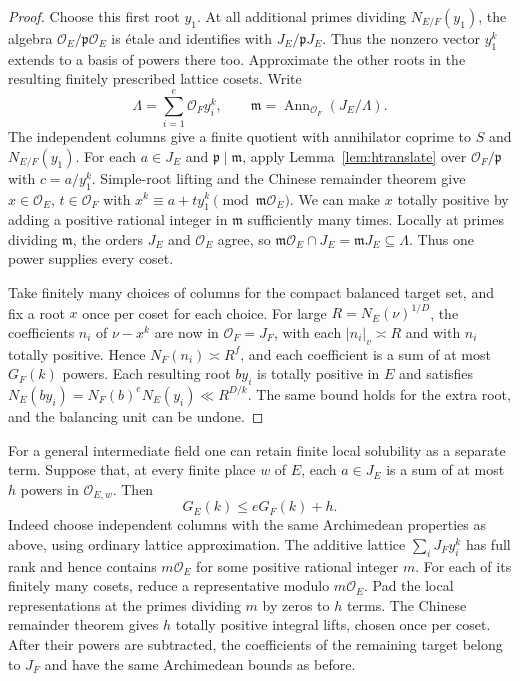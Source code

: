 \documentclass[11pt,letterpaper]{article}
\theoremstyle{definition}
\numberwithin{equation}{section}
\begin{document}
\begin{proof}
Choose this first root $y_1$. At all additional primes dividing
$N_{E/F}(y_1)$, the algebra $\mathcal O_E/\mathfrak p\mathcal O_E$
is \'etale and identifies with $J_E/\mathfrak p J_E$. Thus the
nonzero vector $y_1^k$ extends to a basis of powers there too.
Approximate the other roots in the resulting finitely prescribed
lattice cosets. Write
\[
 \Lambda=\textstyle\sum_{i=1}^{e}\mathcal O_Fy_i^k,\qquad
 \mathfrak m=\operatorname{Ann}_{\mathcal O_F}(J_E/\Lambda).
\]
The independent columns give a finite quotient with annihilator
coprime to $S$ and $N_{E/F}(y_1)$. For each $a\in J_E$ and
$\mathfrak p\mid\mathfrak m$, apply Lemma~\ref{lem:htranslate}
over $\mathcal O_F/\mathfrak p$ with $c=a/y_1^k$. Simple-root
lifting and the Chinese remainder theorem give
$x\in\mathcal O_E$, $t\in\mathcal O_F$ with
$x^k\equiv a+ty_1^k\pmod{\mathfrak m\mathcal O_E}$.
We can make $x$ totally positive by adding a positive rational integer
in $\mathfrak m$ sufficiently many times. Locally at primes dividing
$\mathfrak m$, the orders $J_E$ and $\mathcal O_E$ agree, so
$\mathfrak m\mathcal O_E\cap J_E=\mathfrak m J_E\subseteq\Lambda$.
Thus one power supplies every coset.

Take finitely many choices of columns for the compact balanced target
set, and fix a root $x$ once per coset for each choice. For large
$R=N_E(\nu)^{1/D}$, the coefficients $n_i$ of $\nu-x^k$ are now in
$\mathcal O_F=J_F$, with each $|n_i|_v\asymp R$ and with $n_i$ totally
positive. Hence $N_F(n_i)\asymp R^f$, and each coefficient is a sum
of at most $G_F(k)$ powers. Each resulting root $by_i$ is totally
positive in $E$ and satisfies
$N_E(by_i)=N_F(b)^eN_E(y_i)\ll R^{D/k}$. The same bound holds for
the extra root, and the balancing unit can be undone.
\end{proof}

For a general intermediate field one can retain finite local solubility
as a separate term. Suppose that, at every finite place $w$ of $E$,
each $a\in J_E$ is a sum of at most $h$ powers in
$\mathcal O_{E,w}$. Then
\[
                         G_E(k)\le eG_F(k)+h .
\]
Indeed choose independent columns with the same Archimedean properties
as above, using ordinary lattice approximation. The additive lattice
$\sum_i J_F y_i^k$ has full rank and hence contains $m\mathcal O_E$
for some positive rational integer $m$. For each of its finitely many
cosets, reduce a representative modulo $m\mathcal O_E$. Pad the local
representations at the primes dividing $m$ by zeros to $h$ terms.
The Chinese remainder theorem gives $h$ totally positive integral
lifts, chosen once per coset. After their powers are subtracted,
the coefficients of the remaining target belong to $J_F$ and have
the same Archimedean bounds as before.
\end{document}
